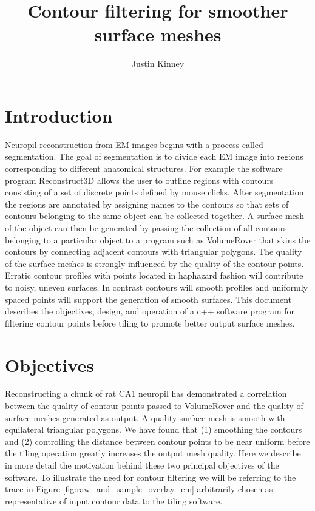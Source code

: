 \documentclass[12pt]{article}
\begin{document}

\title{Contour filtering for smoother surface meshes}

\author{Justin Kinney}

\maketitle

\section{Introduction}

Neuropil reconstruction from EM images begins with a process called
segmentation. The goal of segmentation is to divide each EM image into
regions corresponding to different anatomical structures. For example the
software program Reconstruct3D allows the user to outline regions with
contours consisting of a set of discrete points defined by mouse clicks.
After segmentation the regions are annotated by assigning names to the
contours so that sets of contours belonging to the same object can be
collected together. A surface mesh of the object can then be generated
by passing the collection of all contours belonging to a particular
object to a program such as VolumeRover that skins the contours by
connecting adjacent contours with triangular polygons. The quality of
the surface meshes is strongly influenced by the quality of the contour
points. Erratic contour profiles with points located in haphazard fashion
will contribute to noisy, uneven surfaces. In contrast contours will
smooth profiles and uniformly spaced points will support the generation
of smooth surfaces. This document describes the objectives, design,
and operation of a c++ software program for filtering contour points
before tiling to promote better output surface meshes.


\section{Objectives}

Reconstructing a chunk of rat CA1 neuropil has
demonstrated a correlation between the quality of contour points passed
to VolumeRover and the quality of surface meshes generated as output.
A quality surface mesh is smooth with equilateral triangular
polygons. We have found that (1) smoothing the contours and (2) controlling the
distance between contour points to be near uniform before the tiling
operation greatly increases the output mesh quality. Here we describe
in more detail the motivation behind these two principal objectives of
the software. To illustrate the need for contour filtering we will be
referring to the trace in Figure \ref{fig:raw_and_sample_overlay_em}
arbitrarily chosen as representative of input contour data to the tiling
software.
\end{document}
